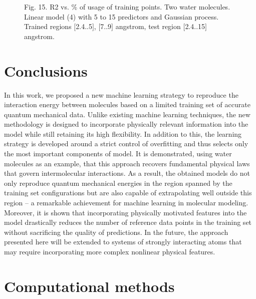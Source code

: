 \documentclass[aps,prl,reprint,amsmath,amssymb,nature]{revtex4-1}
\begin{document}
\begin{figure}[h]
\centering
\caption{Fig. 15. R2 vs. \% of usage of training points. Two water 
molecules. Linear model (4) with 5 to 15 predictors and Gaussian 
process. Trained regions $[$2.4..5$]$, $[$7..9$]$ angstrom, test region 
$[$2.4..15$]$ angstrom.}
\end{figure}


\section{Conclusions}

In this work, we proposed a new machine learning strategy to reproduce the interaction energy between molecules based on a limited training set of accurate quantum mechanical data. Unlike existing machine learning techniques, the new methodology is designed to incorporate physically relevant information into the model while still retaining its high flexibility. In addition to this, the learning strategy is developed around a strict control of overfitting and thus selects only the most important components of model. 
It is demonstrated, using water molecules as an example, that this approach recovers fundamental physical laws that govern intermolecular interactions. As a result, the obtained models do not only reproduce quantum mechanical energies in the region spanned by the training set configurations but are also capable of extrapolating well outside this region -- a remarkable achievement for machine learning in molecular modeling. Moreover, it is shown that incorporating physically motivated features into the model drastically reduces the number of reference data points in the training set without sacrificing the quality of predictions. 
In the future, the approach presented here will be extended to systems of strongly interacting atoms 
that may require incorporating more complex nonlinear physical features. 


\section{Computational methods}
\end{document}
